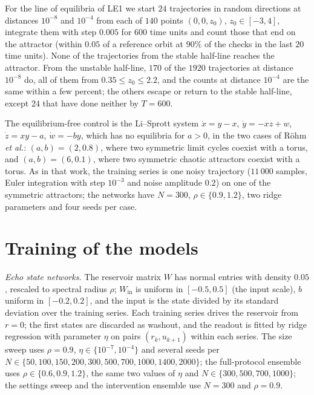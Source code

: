 \documentclass[aip,cha,reprint,amsmath,amssymb,longbibliography]{revtex4-2}
\theoremstyle{definition}
\begin{document}
For the line of equilibria of LE1 we start $24$ trajectories in random directions at distances $10^{-8}$ and $10^{-4}$ from
each of $140$ points $(0,0,z_0)$, $z_0\in[-3,4]$, integrate them with step $0.005$ for $600$ time units and count those that
end on the attractor (within $0.05$ of a reference orbit at $90\%$ of the checks in the last $20$ time units). None of
the trajectories from the stable half-line reaches the attractor. From the unstable half-line, $170$ of the $1920$ trajectories at distance $10^{-8}$
do, all of them from $0.35\le z_0\le2.2$, and the counts at distance $10^{-4}$ are the same within a few percent; the others
escape or return to the stable half-line, except $24$ that have done neither by $T=600$.

The equilibrium-free control is the Li--Sprott system\cite{LiSprott2014} $\dot x=y-x$, $\dot y=-xz+w$, $\dot z=xy-a$,
$\dot w=-by$, which has no equilibria for $a>0$, in the two cases of R\"ohm \textit{et al.}:\cite{Rohm2021} $(a,b)=(2,0.8)$,
where two symmetric limit cycles coexist with a torus, and $(a,b)=(6,0.1)$, where two symmetric chaotic attractors coexist
with a torus. As in that work, the training series is one noisy trajectory ($11\,000$ samples, Euler integration with step
$10^{-3}$ and noise amplitude $0.2$) on one of the symmetric attractors; the networks have $N=300$, $\rho\in\{0.9,1.2\}$, two
ridge parameters and four seeds per case.

\section{Training of the models}
\label{app:training}

\emph{Echo state networks.} The reservoir matrix $W$ has normal entries with density $0.05$, rescaled to spectral radius
$\rho$; $W_{\mathrm{in}}$ is uniform in $[-0.5,0.5]$ (the input scale), $b$ uniform in $[-0.2,0.2]$, and the input is the
state divided by its standard deviation over the training series. Each training series drives the reservoir from $r=0$;
the first states are discarded as washout, and the readout is fitted by ridge regression with parameter $\eta$ on pairs
$(r_k,u_{k+1})$ within each series. The size sweep uses $\rho=0.9$, $\eta\in\{10^{-7},10^{-4}\}$ and several seeds per
$N\in\{50,100,150,200,300,500,700,1000,1400,2000\}$; the full-protocol ensemble uses $\rho\in\{0.6,0.9,1.2\}$, the same two
values of $\eta$ and $N\in\{300,500,700,1000\}$; the settings sweep and the intervention ensemble use $N=300$ and
$\rho=0.9$.
\end{document}
